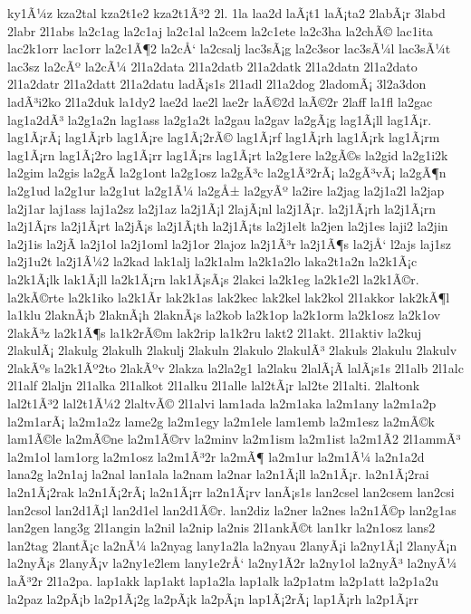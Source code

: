 {ky1Ã¼z
kza2tal
kza2t1e2
kza2t1Ã³2
2l.
1la
laa2d
laÃ¡t1
laÃ¡ta2
2labÃ¡r
3labd
2labr
2l1abs
la2c1ag
la2c1aj
la2c1al
la2cem
la2c1ete
la2c3ha
la2chÃ©
lac1ita
lac2k1orr
lac1orr
la2c1Ã¶2
la2cÅ‘
la2csalj
lac3sÃ¡g
la2c3sor
lac3sÃ¼l
lac3sÃ¼t
lac3sz
la2cÃº
la2cÃ¼
2l1a2data
2l1a2datb
2l1a2datk
2l1a2datn
2l1a2dato
2l1a2datr
2l1a2datt
2l1a2datu
ladÃ¡s1s
2l1adl
2l1a2dog
2ladomÃ¡
3l2a3don
ladÃ³i2ko
2l1a2duk
la1dy2
lae2d
lae2l
lae2r
laÃ©2d
laÃ©2r
2laff
la1fl
la2gac
lag1a2dÃ³
la2g1a2n
lag1ass
la2g1a2t
la2gau
la2gav
la2gÃ¡g
lag1Ã¡ll
lag1Ã¡r.
lag1Ã¡rÃ¡
lag1Ã¡rb
lag1Ã¡re
lag1Ã¡2rÃ©
lag1Ã¡rf
lag1Ã¡rh
lag1Ã¡rk
lag1Ã¡rm
lag1Ã¡rn
lag1Ã¡2ro
lag1Ã¡rr
lag1Ã¡rs
lag1Ã¡rt
la2g1ere
la2gÃ©s
la2gid
la2g1i2k
la2gim
la2gis
la2gÃ­
la2g1ont
la2g1osz
la2gÃ³c
la2g1Ã³2rÃ¡
la2gÃ³vÃ¡
la2gÃ¶n
la2g1ud
la2g1ur
la2g1ut
la2g1Ã¼
la2gÅ±
la2gyÃº
la2ire
la2jag
la2j1a2l
la2jap
la2j1ar
laj1ass
laj1a2sz
la2j1az
la2j1Ã¡l
2lajÃ¡nl
la2j1Ã¡r.
la2j1Ã¡rh
la2j1Ã¡rn
la2j1Ã¡rs
la2j1Ã¡rt
la2jÃ¡s
la2j1Ã¡th
la2j1Ã¡ts
la2j1elt
la2jen
la2j1es
laji2
la2jin
la2j1is
la2jÃ­
la2j1ol
la2j1oml
la2j1or
2lajoz
la2j1Ã³r
la2j1Ã¶s
la2jÅ‘
l2ajs
laj1sz
la2j1u2t
la2j1Ã¼2
la2kad
lak1alj
la2k1alm
la2k1a2lo
laka2t1a2n
la2k1Ã¡c
la2k1Ã¡lk
lak1Ã¡ll
la2k1Ã¡rn
lak1Ã¡sÃ¡s
2lakci
la2k1eg
la2k1e2l
la2k1Ã©r.
la2kÃ©rte
la2k1iko
la2k1Ã­r
lak2k1as
lak2kec
lak2kel
lak2kol
2l1akkor
lak2kÃ¶l
la1klu
2laknÃ¡b
2laknÃ¡h
2laknÃ¡s
la2kob
la2k1op
la2k1orm
la2k1osz
la2k1ov
2lakÃ³z
la2k1Ã¶s
la1k2rÃ©m
lak2rip
la1k2ru
lakt2
2l1akt.
2l1aktiv
la2kuj
2lakulÃ¡
2lakulg
2lakulh
2lakulj
2lakuln
2lakulo
2lakulÃ³
2lakuls
2lakulu
2lakulv
2lakÃºs
la2k1Ãº2to
2lakÃºv
2lakza
la2la2g1
la2laku
2lalÃ¡Ã­
lalÃ¡s1s
2l1alb
2l1alc
2l1alf
2laljn
2l1alka
2l1alkot
2l1alku
2l1alle
lal2tÃ¡r
lal2te
2l1alti.
2laltonk
lal2t1Ã³2
lal2t1Ã¼2
2laltvÃ©
2l1alvi
lam1ada
la2m1aka
la2m1any
la2m1a2p
la2m1arÃ¡
la2m1a2z
lame2g
la2m1egy
la2m1ele
lam1emb
la2m1esz
la2mÃ©k
lam1Ã©le
la2mÃ©ne
la2m1Ã©rv
la2minv
la2m1ism
la2m1ist
la2m1Ã­2
2l1ammÃ³
la2m1ol
lam1org
la2m1osz
la2m1Ã³2r
la2mÃ¶
la2m1ur
la2m1Ã¼
la2n1a2d
lana2g
la2n1aj
la2nal
lan1ala
la2nam
la2nar
la2n1Ã¡ll
la2n1Ã¡r.
la2n1Ã¡2rai
la2n1Ã¡2rak
la2n1Ã¡2rÃ¡
la2n1Ã¡rr
la2n1Ã¡rv
lanÃ¡s1s
lan2csel
lan2csem
lan2csi
lan2csol
lan2d1Ã¡l
lan2d1el
lan2d1Ã©r.
lan2diz
la2ner
la2nes
la2n1Ã©p
lan2g1as
lan2gen
lang3g
2l1angin
la2nil
la2nip
la2nis
2l1ankÃ©t
lan1kr
la2n1osz
lans2
lan2tag
2lantÃ¡c
la2nÃ¼
la2nyag
lany1a2la
la2nyau
2lanyÃ¡i
la2ny1Ã¡l
2lanyÃ¡n
la2nyÃ¡s
2lanyÃ¡v
la2ny1e2lem
lany1e2rÅ‘
la2ny1Ã­2r
la2ny1ol
la2nyÃ³
la2nyÃ¼
laÃ³2r
2l1a2pa.
lap1akk
lap1akt
lap1a2la
lap1alk
la2p1atm
la2p1att
la2p1a2u
la2paz
la2pÃ¡b
la2p1Ã¡2g
la2pÃ¡k
la2pÃ¡n
lap1Ã¡2rÃ¡
lap1Ã¡rh
la2p1Ã¡rr
}
